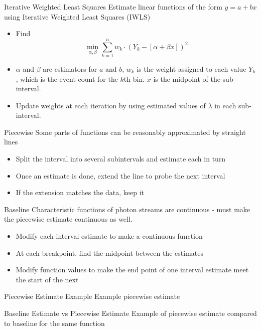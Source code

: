 \documentclass{beamer}
\begin{document}
\begin{frame}{Iterative Weighted Least Squares}
  Estimate linear functions of the form $y=a+bx$ using Iterative Weighted Least Squares (IWLS)
  \begin{itemize}[<+->]
  \item Find \[\min_{\alpha,\beta}\sum_{k=1}^{n}w_k\cdot(Y_k-[\alpha+\beta x])^2\]
  \item $\alpha$ and $\beta$ are estimators for $a$ and $b$, $w_k$ is the weight assigned to each value $Y_k$, which is the event count for the $k$th bin. $x$ is the midpoint of the sub-interval.
  \item Update weights at each iteration by using estimated values of $\lambda$ in each sub-interval.
  \end{itemize}
\end{frame}

\begin{frame}{Piecewise}
  Some parts of functions can be reasonably approximated by straight lines
  \begin{itemize}[<+->]
  \item Split the interval into several subintervals and estimate each in turn
  \item Once an estimate is done, extend the line to probe the next interval
  \item If the extension matches the data, keep it
  \end{itemize}
\end{frame}

\begin{frame}{Baseline}
  Characteristic functions of photon streams are continuous - must make the
  piecewise estimate continuous as well.
  \begin{itemize}[<+->]
  \item Modify each interval estimate to make a continuous function
  \item At each breakpoint, find the midpoint between the estimates
  \item Modify function values to make the end point of one interval
    estimate meet the start of the next
  \end{itemize}
\end{frame}

\begin{frame}{Piecewise Estimate Example}
  Example piecewise estimate
\end{frame}

\begin{frame}{Baseline Estimate vs Piecewise Estimate}
  Example of piecewise estimate compared to baseline for the same function
\end{frame}
\end{document}
